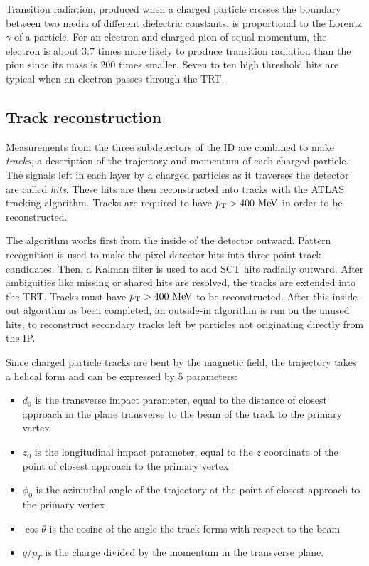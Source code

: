 Transition radiation, produced when a charged particle crosses the boundary between two media of different dielectric constants, is proportional to the Lorentz $\gamma$ of a particle. For an electron and charged pion of equal momentum, the electron is about 3.7 times more likely to produce transition radiation than the pion since its mass is 200 times smaller. Seven to ten high threshold hits are typical when an electron passes through the TRT. 


\subsection{Track reconstruction}
Measurements from the three subdetectors of the ID are combined to make \emph{tracks}, a description of the trajectory and momentum of each charged particle. The signals left in each layer by a charged particles as it traverses the detector are called \emph{hits}. These hits are then reconstructed into tracks with the ATLAS tracking algorithm\cite{ATLAS-CONF-2012-042}. Tracks are required to have $\pt > 400 \mev$ in order to be reconstructed.

The algorithm works first from the inside of the detector outward. Pattern recognition is used to make the pixel detector hits into three-point track candidates. Then, a Kalman filter is used to add SCT hits radially outward. After ambiguities like missing or shared hits are resolved, the tracks are extended into the TRT. Tracks must have $\pt > 400 \mev$ to be reconstructed. After this inside-out algorithm as been completed, an outside-in algorithm is run on the unused hits, to reconstruct secondary tracks left by particles not originating directly from the IP.

Since charged particle tracks are bent by the magnetic field, the trajectory takes a helical form and can be expressed by 5 parameters: 
\begin{itemize}
\item $d_0$ is the transverse impact parameter, equal to the distance of closest approach in the plane transverse to the beam of the track to the primary vertex
\item $z_0$ is the longitudinal impact parameter, equal to the $z$ coordinate of the point of closest approach to the primary vertex
\item $\phi_0$ is the azimuthal angle of the trajectory at the point of closest approach to the primary vertex
\item $\cos\theta$ is the cosine of the angle the track forms with respect to the beam
\item $q/p_T$ is the charge divided by the momentum in the transverse plane.
\end{itemize}



